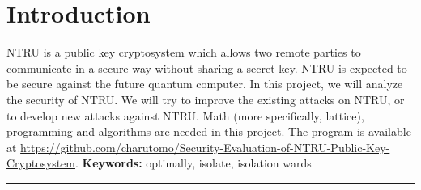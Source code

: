 
\chapter{Introduction}
NTRU is a public key cryptosystem which allows two remote parties to communicate in a secure way without sharing a secret key. 
NTRU is expected to be secure against the future quantum computer. In this project, we will analyze the security of NTRU.
We will try to improve the existing attacks on NTRU, or to develop new attacks against NTRU. Math (more specifically, lattice), programming and algorithms are needed in this project.
 The program is available at 
\url{https://github.com/charutomo/Security-Evaluation-of-NTRU-Public-Key-Cryptosystem}.
\newline
\textbf{Keywords:} optimally, isolate, isolation wards
\par\noindent\rule{\textwidth}{0.4pt}
\newpage